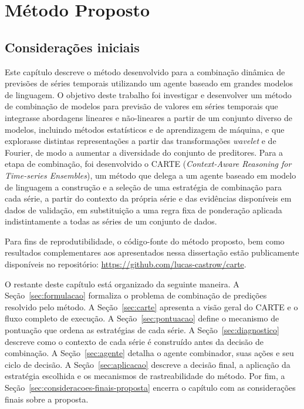 \chapter{Método Proposto}\label{chp:proposta}

\section{Considerações iniciais}

Este capítulo descreve o método desenvolvido para a combinação dinâmica de previsões de séries temporais utilizando um agente baseado em grandes modelos de linguagem. O objetivo deste trabalho foi investigar e desenvolver um método de combinação de modelos para previsão de valores em séries temporais que integrasse abordagens lineares e não-lineares a partir de um conjunto diverso de modelos, incluindo métodos estatísticos e de aprendizagem de máquina, e que explorasse distintas representações a partir das transformações \textit{wavelet} e de Fourier, de modo a aumentar a diversidade do conjunto de preditores. Para a etapa de combinação, foi desenvolvido o CARTE (\textit{Context-Aware Reasoning for Time-series Ensembles}), um método que delega a um agente baseado em modelo de linguagem a construção e a seleção de uma estratégia de combinação para cada série, a partir do contexto da própria série e das evidências disponíveis em dados de validação, em substituição a uma regra fixa de ponderação aplicada indistintamente a todas as séries de um conjunto de dados.

Para fins de reprodutibilidade, o código-fonte do método proposto, bem como resultados complementares aos apresentados nessa dissertação estão publicamente disponíveis no repositório: \url{https://github.com/lucas-castrow/carte}.

O restante deste capítulo está organizado da seguinte maneira. A Seção~\ref{sec:formulacao} formaliza o problema de combinação de predições resolvido pelo método. A Seção~\ref{sec:carte} apresenta a visão geral do CARTE e o fluxo completo de execução. A Seção~\ref{sec:pontuacao} define o mecanismo de pontuação que ordena as estratégias de cada série. A Seção~\ref{sec:diagnostico} descreve como o contexto de cada série é construído antes da decisão de combinação. A Seção~\ref{sec:agente} detalha o agente combinador, suas ações e seu ciclo de decisão. A Seção~\ref{sec:aplicacao} descreve a decisão final, a aplicação da estratégia escolhida e os mecanismos de rastreabilidade do método. Por fim, a Seção~\ref{sec:consideracoes-finais-proposta} encerra o capítulo com as considerações finais sobre a proposta.



